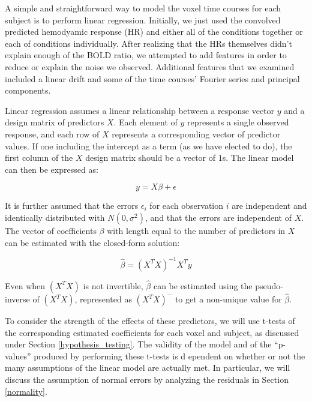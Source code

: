 \par \indent A simple and straightforward way to model the voxel time courses 
for each subject is to perform linear regression. Initially, we just used the 
convolved predicted hemodyamic response (HR) and either all of the 
conditions together or each of conditions individually. After realizing that 
the HRs themselves didn't explain enough of the BOLD ratio, we attempted to 
add features in order to reduce or explain the noise we observed. Additional 
features that we examined included a linear drift and some of the time 
courses' Fourier series and principal components.

\par Linear regression assumes a linear relationship between a response 
vector $y$ and a design matrix of predictors $X$. Each element of $y$ 
represents a single observed response, and each row of $X$ represents a 
corresponding vector of predictor values. If one including the intercept as a 
term (as we have elected to do), the first column of the $X$ design matrix 
should be a vector of $1$s. The linear model can then be expressed as: 

\begin{equation}
y = X\beta + \epsilon
\end{equation}

\par It is further assumed that the errors $\epsilon_i$ for each observation 
$i$ are independent and identically distributed with $N(0, \sigma^2)$, and 
that the errors are independent of $X$. The vector of coefficients $\beta$ 
with length equal to the number of predictors in $X$ can be estimated with 
the closed-form solution:

\begin{equation}
\hat{\beta} =(X^T X)^{-1} X^T y
\end{equation}

\par Even when $(X^T X)$ is not invertible, $\hat{\beta}$ can be estimated 
using the pseudo-inverse of $(X^T X)$, represented as $(X^T X)^{-}$ to get a 
non-unique value for $\hat{\beta}$.

\par To consider the strength of the effects of these predictors, we will use 
t-tests of the corresponding estimated coefficients for each voxel and 
subject, as discussed under Section \ref{hypothesis_testing}. The validity of 
the model and of the ``p-values'' produced by performing these t-tests is d
ependent on whether or not the many assumptions of the linear model are 
actually met. In particular, we will discuss the assumption of normal errors 
by analyzing the residuals in Section \ref{normality}. 


